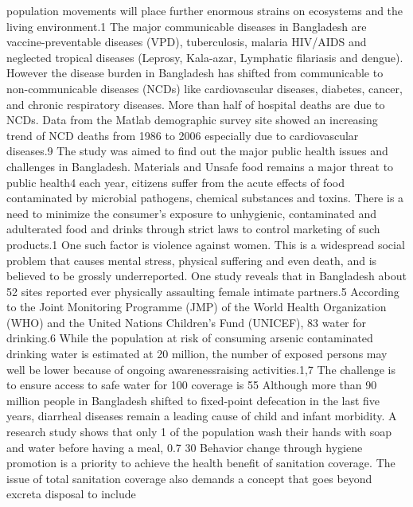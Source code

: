 \documentclass[a4paper,12pt]{article}
\begin{document}
population movements will place further enormous
strains on ecosystems and the living environment.1
The major communicable diseases in Bangladesh are
vaccine-preventable diseases (VPD), tuberculosis,
malaria HIV/AIDS and neglected tropical diseases
(Leprosy, Kala-azar, Lymphatic filariasis and dengue).
However the disease burden in Bangladesh has shifted
from communicable to non-communicable diseases
(NCDs) like cardiovascular diseases, diabetes, cancer,
and chronic respiratory diseases. More than half of
hospital deaths are due to NCDs. Data from the Matlab
demographic survey site showed an increasing trend of
NCD deaths from 1986 to 2006 especially due to
cardiovascular diseases.9 The study was aimed to find
out the major public health issues and challenges in
Bangladesh.
Materials and Unsafe food remains a major threat to public health4
each
year, citizens suffer from the acute effects of food
contaminated by microbial pathogens, chemical
substances and toxins. There is a need to minimize the
consumer’s exposure to unhygienic, contaminated and
adulterated food and drinks through strict laws to control
marketing of such products.1
One such factor is violence against women. This is a
widespread social problem that causes mental stress,
physical suffering and even death, and is believed to be grossly underreported. One study reveals that in
Bangladesh about 52%
sites reported ever physically assaulting female intimate partners.5 According to the Joint Monitoring
Programme (JMP) of the World Health Organization
(WHO) and the United Nations Children’s Fund
(UNICEF), 83%
water for drinking.6 While the population at risk of consuming arsenic contaminated drinking water is
estimated at 20 million, the number of exposed persons
may well be lower because of ongoing awarenessraising activities.1,7 The challenge is to ensure access to
safe water for 100%
coverage is 55%
Although more than 90 million people in Bangladesh
shifted to fixed-point defecation in the last five years,
diarrheal diseases remain a leading cause of child and
infant morbidity. A research study shows that only 1%
of the population wash their hands with soap and water
before having a meal, 0.7%
30%
Behavior change through hygiene promotion is a
priority to achieve the health benefit of sanitation coverage. The issue of total sanitation coverage also demands
a concept that goes beyond excreta disposal to include
\end{document}

